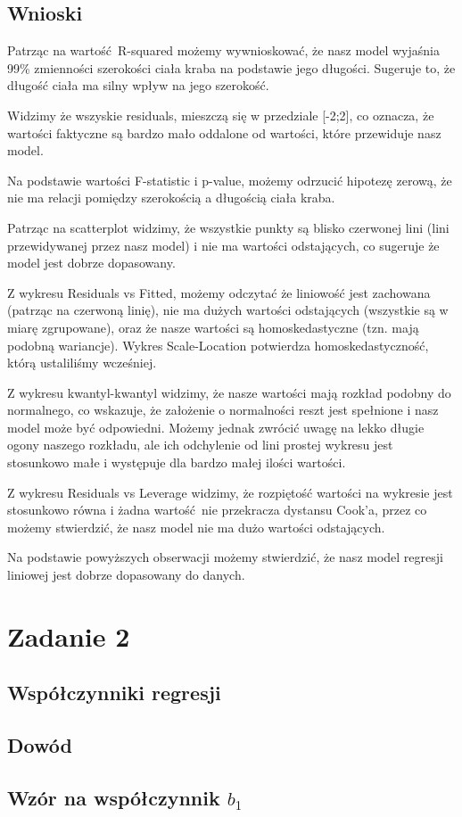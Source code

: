 \documentclass[11pt]{article}
\begin{document}
\pagebreak

\subsection{Wnioski}
Patrząc na wartość R-squared możemy wywnioskować, że nasz model wyjaśnia
99\% zmienności szerokości ciała kraba na podstawie jego długości. Sugeruje to,
że długość ciała ma silny wpływ na jego szerokość.

Widzimy że wszyskie residuals, mieszczą się w przedziale [-2;2], co oznacza,
że wartości faktyczne są bardzo mało oddalone od wartości, które przewiduje nasz
model.

Na podstawie wartości F-statistic i p-value, możemy odrzucić hipotezę zerową,
że nie ma relacji pomiędzy szerokością a długością ciała kraba.

Patrząc na scatterplot widzimy, że wszystkie punkty są blisko czerwonej lini
(lini przewidywanej przez nasz model) i nie ma wartości odstających, co sugeruje
że model jest dobrze dopasowany.

Z wykresu Residuals vs Fitted, możemy odczytać że liniowość jest zachowana
(patrząc na czerwoną linię), nie ma dużych wartości odstających (wszystkie są
w miarę zgrupowane), oraz że nasze wartości są homoskedastyczne (tzn. mają
podobną wariancje). Wykres Scale-Location potwierdza homoskedastyczność, którą
ustaliliśmy wcześniej.

Z wykresu kwantyl-kwantyl widzimy, że nasze wartości mają rozkład podobny do
normalnego, co wskazuje, że założenie o normalności reszt jest spełnione i nasz
model może być odpowiedni. Możemy jednak zwrócić uwagę na lekko długie ogony
naszego rozkładu, ale ich odchylenie od lini prostej wykresu jest stosunkowo
małe i występuje dla bardzo małej ilości wartości.

Z wykresu Residuals vs Leverage widzimy, że rozpiętość wartości na wykresie
jest stosunkowo równa i żadna wartość nie przekracza dystansu Cook'a, przez co
możemy stwierdzić, że nasz model nie ma dużo wartości odstających.

Na podstawie powyższych obserwacji możemy stwierdzić, że nasz model regresji
liniowej jest dobrze dopasowany do danych.

\pagebreak

\section{Zadanie 2}
\subsection{Współczynniki regresji}
\subsection{Dowód}
\subsection{Wzór na współczynnik $b_1$}
\end{document}
